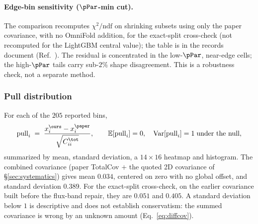 \paragraph{Edge-bin sensitivity ($\pPar$-min cut).} The comparison recomputes $\chi^{2}/\mathrm{ndf}$ on shrinking subsets using only the paper covariance, with no OmniFold addition, for the exact-split cross-check (not recomputed for the LightGBM central value); the table is in the records document (Ref.~\cite{NoteRecords2026}). The residual is concentrated in the low-$\pPar$, near-edge cells; the high-$\pPar$ tails carry sub-$2\%$ shape disagreement. This is a robustness check, not a separate method.

\subsubsection{Pull distribution}
\label{sec:pull}

For each of the $205$ reported bins,
\begin{equation}
\mathrm{pull}_{i}
\;=\;
\frac{x^{\ours}_{i} - x^{\paper}_{i}}{\sqrt{C^{\tot}_{ii}}},
\qquad
\mathbb{E}[\mathrm{pull}_{i}] = 0,\quad
\mathrm{Var}[\mathrm{pull}_{i}] = 1
\;\text{under the null},
\end{equation}
summarized by mean, standard deviation, a $14\times16$ heatmap and histogram. The combined covariance (paper TotalCov $+$ the quoted 2D covariance of \S\ref{sec:systematics}) gives mean $\boxed{0.034}$, centered on zero with no global offset, and standard deviation $\boxed{0.389}$. For the exact-split cross-check, on the earlier covariance built before the flux-band repair, they are $0.051$ and $0.405$. A standard deviation below $1$ is descriptive and does not establish conservatism: the summed covariance is wrong by an unknown amount (Eq.~\eqref{eq:diffcov}). 

